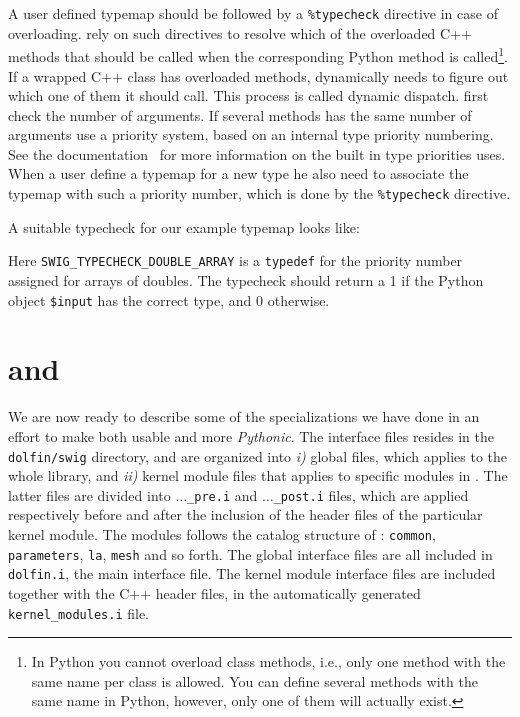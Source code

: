 \begin{code}
A user defined typemap should be followed by a \texttt{\%typecheck} directive 
in case of overloading. \swig rely on such directives to resolve which of the overloaded C++ methods that should be 
called when the corresponding Python method is called\footnote{In Python you cannot overload class methods, i.e., only one method with the same name per class is allowed. You can define several methods with the same name in Python, however, only one of them will actually exist.}. If a wrapped C++ class has overloaded methods, \swig dynamically needs to figure out which one of them it should call. This process is called dynamic dispatch. \swig first check the number of arguments. If several methods has the same number of arguments \swig use a priority system, based on an internal type priority numbering. See the \swig documentation~\cite{SWIG} for more information on the built in type priorities \swig uses. When a user define a typemap for a new type he also need to associate the typemap with such a priority number, which is done by the \texttt{\%typecheck} directive.\par
A suitable typecheck for our example typemap looks like:
Here \texttt{SWIG\_TYPECHECK\_DOUBLE\_ARRAY} is a \texttt{typedef} for the priority number assigned for arrays of doubles. The typecheck should return a 1 if the Python object \texttt{\$input} has the correct type, and 0 otherwise.\par

\section{\swig and \pydolfin}
We are now ready to describe some of the specializations we have done in an effort to make \pydolfin both usable and more \textit{Pythonic}. The interface files resides in the \texttt{dolfin/swig} directory, and are organized into \textit{i)} global files, which applies to the whole \dolfin library, and \textit{ii)} kernel module files that applies to specific modules in \dolfin. The latter files are divided into \texttt{$\ldots$\_pre.i} and \texttt{$\ldots$\_post.i} files, which are applied respectively before and after the inclusion of the header files of the particular kernel module. The modules follows the catalog structure of \dolfin: \texttt{common}, \texttt{parameters}, \texttt{la}, \texttt{mesh} and so forth. The global interface files are all included in \texttt{dolfin.i}, the main \swig interface file. The kernel module interface files are included together with the C++ header files, in the automatically generated \texttt{kernel\_modules.i} file.\par


\end{code}
